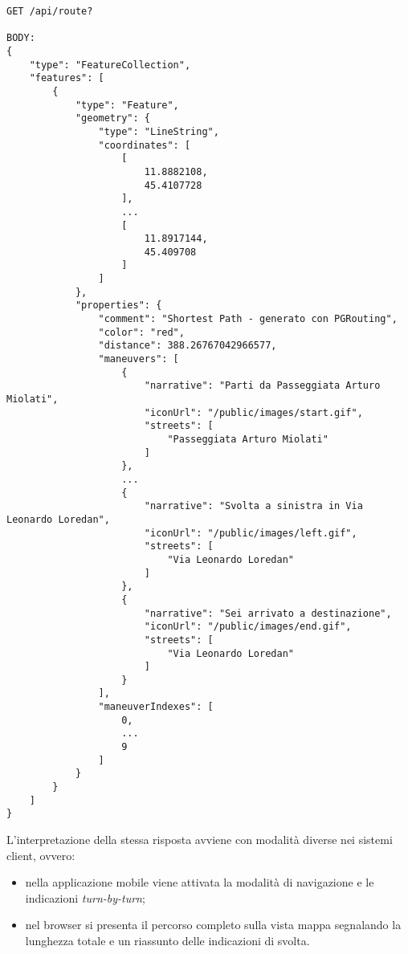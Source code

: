 \begin{lstlisting}[caption=Invocazione API di routing,label=response-routing]
GET /api/route?

BODY: 
{
    "type": "FeatureCollection",
    "features": [
        {
            "type": "Feature",
            "geometry": {
                "type": "LineString",
                "coordinates": [
                    [
                        11.8882108,
                        45.4107728
                    ],
                    ...
                    [
                        11.8917144,
                        45.409708
                    ]
                ]
            },
            "properties": {
                "comment": "Shortest Path - generato con PGRouting",
                "color": "red",
                "distance": 388.26767042966577,
                "maneuvers": [
                    {
                        "narrative": "Parti da Passeggiata Arturo Miolati",
                        "iconUrl": "/public/images/start.gif",
                        "streets": [
                            "Passeggiata Arturo Miolati"
                        ]
                    },                  
                    ...
                    {
                        "narrative": "Svolta a sinistra in Via Leonardo Loredan",
                        "iconUrl": "/public/images/left.gif",
                        "streets": [
                            "Via Leonardo Loredan"
                        ]
                    },
                    {
                        "narrative": "Sei arrivato a destinazione",
                        "iconUrl": "/public/images/end.gif",
                        "streets": [
                            "Via Leonardo Loredan"
                        ]
                    }
                ],
                "maneuverIndexes": [
                    0,             
                    ...
                    9
                ]
            }
        }
    ]
}
\end{lstlisting}

L'interpretazione della stessa risposta avviene con modalità diverse nei sistemi client, ovvero:
\begin{itemize}
\item nella applicazione mobile viene attivata la modalità di navigazione e le indicazioni \emph{turn-by-turn};
\item nel browser si presenta il percorso completo sulla vista mappa segnalando la lunghezza totale e un riassunto delle indicazioni di svolta.
\end{itemize}


